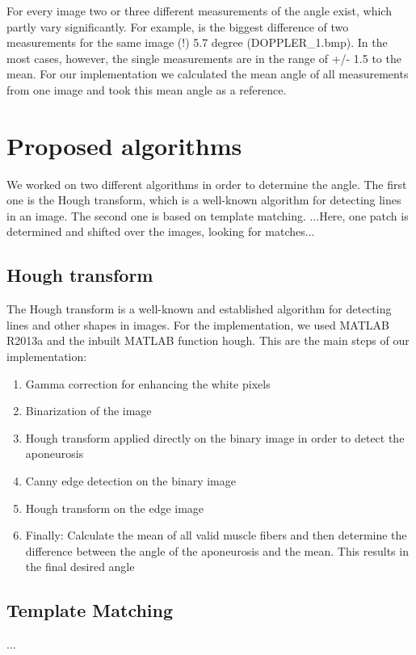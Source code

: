 \documentclass[10pt,twocolumn,letterpaper]{article}
\begin{document}
For every image two or three different measurements of the angle exist, which partly vary significantly. For example, is the biggest difference of two measurements for the same image (!) 5.7 degree (DOPPLER\_1.bmp). In the most cases, however, the single measurements are in the range of +/- 1.5 to the mean.
For our implementation we calculated the mean angle of all measurements from one image and took this mean angle as a reference.

\section{Proposed algorithms}
We worked on two different algorithms in order to determine the angle. The first one is the Hough transform, which is a well-known algorithm for detecting lines in an image. The second one is based on template matching. ...Here, one patch is determined and shifted over the images, looking for matches...

\subsection{Hough transform}
The Hough transform is a well-known and established algorithm for detecting lines and other shapes in images. For the implementation, we used MATLAB R2013a and the inbuilt MATLAB function hough.
This are the main steps of our implementation:

\begin{enumerate}
     \item Gamma correction for enhancing the white pixels
     \item Binarization of the image
     \item Hough transform applied directly on the binary image in order to detect the aponeurosis
     \item Canny edge detection on the binary image
     \item Hough transform on the edge image
     \item Finally: Calculate the mean of all valid muscle fibers and then determine the difference between the angle of the aponeurosis and the mean. This results in the final desired angle
\end{enumerate}



\subsection{Template Matching}
...
\end{document}
